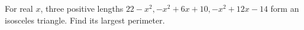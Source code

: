 For real $x$, three positive lengths $22-x^2,-x^2+6x+10,-x^2+12x-14$ form an isosceles triangle. Find its largest perimeter.

